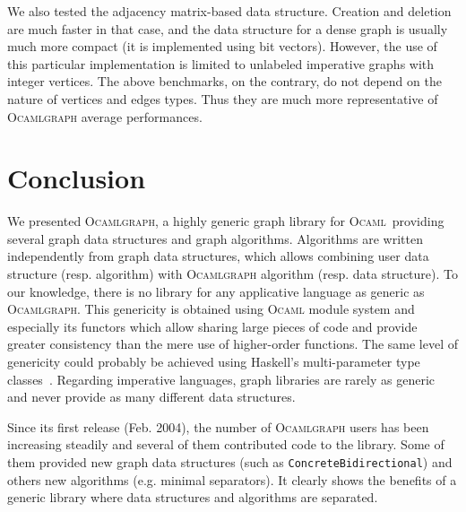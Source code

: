 \documentclass[tfpsymp,pagenumbers]{tfp07symp}
\newcommand{\ocamlgraph}{\textsc{Ocamlgraph}\xspace}
\newcommand{\ocaml}{\textsc{Ocaml}\xspace}
\begin{document}
% 

We also tested the adjacency matrix-based data structure. Creation and
deletion are much faster in that case, and the data structure for
a dense graph is usually much more compact (it is implemented using bit
vectors). However, the use of this particular implementation is
limited to unlabeled imperative graphs with integer vertices. 
The above benchmarks, on the contrary, do not depend on the nature of
vertices and edges types. Thus they are much more representative of
\ocamlgraph average performances.


\section{Conclusion}

We presented \ocamlgraph, a highly generic graph library for \ocaml\
providing several graph data structures and graph algorithms.
Algorithms are written independently from graph data structures, which
allows combining user data structure (resp. algorithm) with
\ocamlgraph algorithm (resp. data structure).  To our knowledge, there
is no library for any applicative language as generic as \ocamlgraph.
This genericity is obtained using \ocaml module system and especially
its functors which allow sharing large pieces of code and provide
greater consistency than the mere use of higher-order functions.  The
same level of genericity could probably be achieved using Haskell's
multi-parameter type classes~\cite{Dreyer2007,Wehr2005,Oleg}.
Regarding imperative 
languages, graph libraries are rarely as generic and never provide as
many different data structures.

Since its first release (Feb. 2004), the number of \ocamlgraph users
has been increasing steadily and several of them contributed code to the
library. Some of them provided new graph data structures (such as
\texttt{ConcreteBidirectional}) and others new algorithms
(e.g. minimal separators). It clearly shows the benefits of a generic
library where data structures and algorithms are separated.


\end{document}
